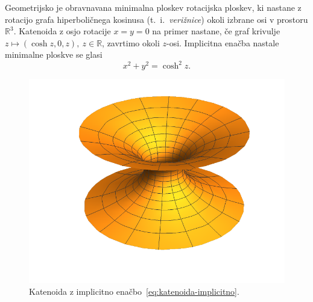 \documentclass[12pt,a4paper,twoside]{article}
\theoremstyle{definition} %
\theoremstyle{plain} %
\numberwithin{equation}{section}  %
\begin{document}
Geometrijsko je obravnavana minimalna ploskev rotacijska ploskev, ki nastane z rotacijo grafa hiperboličnega kosinusa (t.~i.~\emph{verižnice}) okoli izbrane osi v prostoru $\mathbb{R}^3$. Katenoida z osjo rotacije $x=y=0$ na primer nastane, če graf krivulje $z \mapsto (\cosh z, 0, z), \ z \in \mathbb{R}$, zavrtimo okoli $z$-osi. Implicitna enačba nastale minimalne ploskve se glasi
\begin{equation} \label{eq:katenoida-implicitno}
x^2 + y^2 = \cosh ^2 z.
\end{equation}

\begin{figure}[h!]
\begin{center}
\includegraphics[scale=0.8]{images/catenoid.pdf}
\caption{Katenoida z implicitno enačbo~\eqref{eq:katenoida-implicitno}.}
\end{center}
\end{figure}
\end{document}

